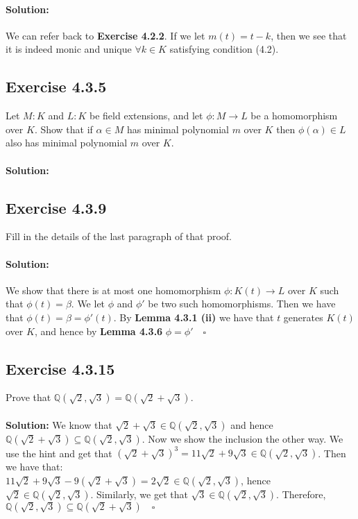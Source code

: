\documentclass{article}
\begin{document}
\paragraph{Solution:}
We can refer back to \textbf{Exercise 4.2.2}.
If we let $m(t) = t - k$, then we see that it is indeed monic and unique $\forall k \in K$ satisfying condition (4.2).

\subsection*{Exercise 4.3.5}
Let $M:K$ and $L:K$ be field extensions, and let $\phi: M \rightarrow L$ be a homomorphism over $K$. Show that if $\alpha \in M$ has
minimal polynomial $m$ over $K$ then $\phi(\alpha) \in L$ also has minimal polynomial $m$ over $K$.
\\\\
\textbf{Solution:}

\subsection*{Exercise 4.3.9}
Fill in the details of the last paragraph of that proof.
\paragraph{Solution:}
We show that there is at most one homomorphism $\phi: K(t) \rightarrow L$ over $K$ such that $\phi(t)= \beta$.
We let $\phi$ and $\phi'$ be two such homomorphisms. Then we have that $\phi(t) = \beta = \phi'(t)$. By \textbf{Lemma 4.3.1 (ii)}
we have that $t$ generates $K(t)$ over $K$, and hence by \textbf{Lemma 4.3.6} $\phi = \phi' \quad \square$


\subsection*{Exercise 4.3.15}
Prove that $\mathbb{Q}(\sqrt 2, \sqrt 3) = \mathbb{Q}(\sqrt 2 + \sqrt 3)$.
\\\\
\textbf{Solution:}
We know that $\sqrt2 + \sqrt3 \in \mathbb{Q}(\sqrt2, \sqrt3)$ and hence $\mathbb{Q}(\sqrt2 + \sqrt3) \subseteq \mathbb{Q}(\sqrt2 , \sqrt3)$. Now we show the inclusion the other way.
We use the hint and get that $(\sqrt2 + \sqrt3)^3 = 11\sqrt2 + 9\sqrt3 \in \mathbb{Q}(\sqrt2, \sqrt3)$. Then we have that:\\ $11\sqrt2 + 9\sqrt3 - 9(\sqrt2 + \sqrt3 ) = 2\sqrt2 \in \mathbb{Q}(\sqrt2, \sqrt3)$, 
hence $\sqrt2 \in \mathbb{Q}(\sqrt2, \sqrt3)$. Similarly, we get that $\sqrt3 \in \mathbb{Q}(\sqrt2, \sqrt3)$. Therefore, $\mathbb{Q}(\sqrt2, \sqrt3) \subseteq \mathbb{Q}(\sqrt2 + \sqrt3) \quad \square$
\end{document}
